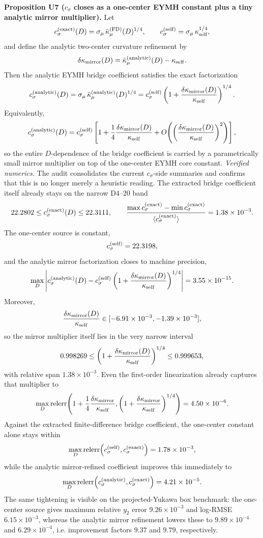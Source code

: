 \documentclass[aps,prd,onecolumn,notitlepage,nofootinbib,superscriptaddress,11pt,floatfix]{revtex4-2}
\begin{document}
\medskip\noindent\textbf{Proposition U7 (\texorpdfstring{$c_\sigma$}{c_sigma} closes as a one-center EYMH constant plus a tiny analytic mirror multiplier).}
Let
\[
c_\sigma^{\rm(exact)}(D)=\sigma_\mu\,\bar\kappa_\mu^{\rm(FD)}(D)^{1/4},
\qquad
c_\sigma^{\rm(self)}=\sigma_\mu\,\kappa_{\rm self}^{1/4},
\]
and define the analytic two-center curvature refinement by
\[
\delta\kappa_{\rm mirror}(D)=\bar\kappa_\mu^{\rm(analytic)}(D)-\kappa_{\rm self}.
\]
Then the analytic EYMH bridge coefficient satisfies the exact factorization
\[
c_\sigma^{\rm(analytic)}(D)
=
\sigma_\mu\,\bar\kappa_\mu^{\rm(analytic)}(D)^{1/4}
=
c_\sigma^{\rm(self)}
\left(1+\frac{\delta\kappa_{\rm mirror}(D)}{\kappa_{\rm self}}\right)^{1/4}.
\]
Equivalently,
\[
c_\sigma^{\rm(analytic)}(D)
=
c_\sigma^{\rm(self)}
\left[
1+\frac14\frac{\delta\kappa_{\rm mirror}(D)}{\kappa_{\rm self}}
+O\!\left(\left(\frac{\delta\kappa_{\rm mirror}(D)}{\kappa_{\rm self}}\right)^2\right)
\right],
\]
so the entire \(D\)-dependence of the bridge coefficient is carried by a parametrically small mirror multiplier on top of the one-center EYMH core constant.
\emph{Verified numerics.}
The audit  consolidates the current \(c_\sigma\)-side summaries and confirms that this is no longer merely a heuristic reading.  The extracted bridge coefficient itself already stays on the narrow D4--20 band
\[
22.2802\le c_\sigma^{\rm(exact)}(D)\le 22.3111,
\qquad
\frac{\max c_\sigma^{\rm(exact)}-\min c_\sigma^{\rm(exact)}}{\langle c_\sigma^{\rm(exact)}\rangle}=1.38\times10^{-3}.
\]
The one-center source is constant,
\[
c_\sigma^{\rm(self)}=22.3198,
\]
and the analytic mirror factorization closes to machine precision,
\[
\max_D\left|
c_\sigma^{\rm(analytic)}(D)
-c_\sigma^{\rm(self)}
\left(1+\frac{\delta\kappa_{\rm mirror}(D)}{\kappa_{\rm self}}\right)^{1/4}
\right|
=
3.55\times10^{-15}.
\]
Moreover,
\[
\frac{\delta\kappa_{\rm mirror}(D)}{\kappa_{\rm self}}
\in[-6.91\times10^{-3},-1.39\times10^{-3}],
\]
so the mirror multiplier itself lies in the very narrow interval
\[
0.998269\le
\left(1+\frac{\delta\kappa_{\rm mirror}(D)}{\kappa_{\rm self}}\right)^{1/4}
\le 0.999653,
\]
with relative span \(1.38\times10^{-3}\).  Even the first-order linearization already captures that multiplier to
\[
\max_D {\rm relerr}\!\left(
1+\frac14\frac{\delta\kappa_{\rm mirror}}{\kappa_{\rm self}},
\left(1+\frac{\delta\kappa_{\rm mirror}}{\kappa_{\rm self}}\right)^{1/4}
\right)
=4.50\times10^{-6}.
\]
Against the extracted finite-difference bridge coefficient, the one-center constant alone stays within
\[
\max_D {\rm relerr}\!\left(c_\sigma^{\rm(self)},c_\sigma^{\rm(exact)}\right)=1.78\times10^{-3},
\]
while the analytic mirror-refined coefficient improves this immediately to
\[
\max_D {\rm relerr}\!\left(c_\sigma^{\rm(analytic)},c_\sigma^{\rm(exact)}\right)=4.21\times10^{-5}.
\]
The same tightening is visible on the projected-Yukawa box benchmark: the one-center source gives maximum relative \(y_2\) error \(9.26\times10^{-3}\) and log-RMSE \(6.15\times10^{-3}\), whereas the analytic mirror refinement lowers these to \(9.89\times10^{-4}\) and \(6.29\times10^{-4}\), i.e. improvement factors \(9.37\) and \(9.79\), respectively.
\end{document}
